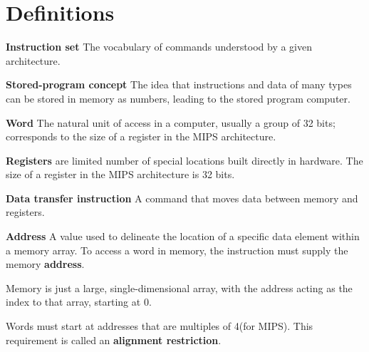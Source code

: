 \documentclass[a4paper,oneside]{book}
\begin{document}
\section{Definitions}
\begin{definition} 
\textbf{Instruction set} The vocabulary of commands understood by a given architecture.
\end{definition}
\begin{definition}
\textbf{Stored-program concept} The idea that instructions and data of many types can be stored in memory as numbers, leading to the stored program computer.
\end{definition}
\begin{definition}[Word]
\textbf{Word} The natural unit of access in a computer, usually a group of 32 bits; corresponds to the size of a register in the MIPS architecture.
\end{definition}
\begin{definition}[Registers]
\textbf{Registers} are limited number of special locations built directly in hardware. The size of a register in the MIPS architecture is 32 bits.
\end{definition}
\begin{definition}
\textbf{Data transfer instruction} A command that moves data between memory and registers. 
\end{definition}
\begin{definition}[Address]
\textbf{Address} A value used to delineate the location of a specific data element within a memory array. To access a word in memory, the instruction must supply the memory \textbf{address}.
\end{definition}
Memory is just a large, single-dimensional array, with the address acting as the index to that array, starting at 0.
\begin{definition}
\end{definition}
\begin{definition}[Offset]
\end{definition}
\begin{definition}
Words must start at addresses that are multiples of 4(for MIPS). This requirement is called an \textbf{alignment restriction}.
\end{definition}
\end{document}
